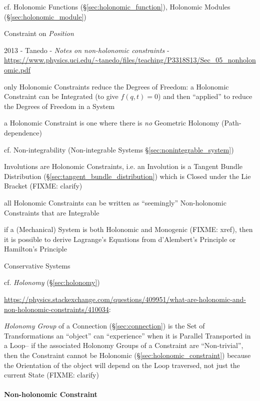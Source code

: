 \fist cf. Holonomic Functions (\S\ref{sec:holonomic_function}), Holonomic
Modules (\S\ref{sec:holonomic_module})

Constraint on \emph{Position}

\asterism

2013 - Tanedo - \emph{Notes on non-holonomic constraints} -
\url{https://www.physics.uci.edu/~tanedo/files/teaching/P3318S13/Sec_05_nonholonomic.pdf}

only Holonomic Constraints reduce the Degrees of Freedom: a Holonomic
Constraint can be Integrated (to give $f(q, t) = 0$) and then ``applied'' to
reduce the Degrees of Freedom in a System

a Holonomic Constraint is one where there is \emph{no} Geometric Holonomy
(Path-dependence)

cf. Non-integrability (Non-integrable Systems \S\ref{sec:nonintegrable_system})

Involutions are Holonomic Constraints, i.e. an Involution is a Tangent Bundle
Distribution (\S\ref{sec:tangent_bundle_distribution}) which is Closed under
the Lie Bracket (FIXME: clarify)

all Holonomic Constraints can be written as ``seemingly'' Non-holonomic
Constraints that are Integrable

\asterism

if a (Mechanical) System is both Holonomic and Monogenic (FIXME: xref), then it
is possible to derive Lagrange's Equations from d'Alembert's Principle or
Hamilton's Principle

Conservative Systems

cf. \emph{Holonomy} (\S\ref{sec:holonomy})

\url{https://physics.stackexchange.com/questions/409951/what-are-holonomic-and-non-holonomic-constraints/410034}:

\emph{Holonomy Group} of a Connection (\S\ref{sec:connection}) is the Set of
Transformations an ``object'' can ``experience'' when it is Parallel
Transported in a Loop-- if the associated Holonomy Groups of a Constraint are
``Non-trivial'', then the Constraint cannot be Holonomic
(\S\ref{sec:holonomic_constraint}) because the Orientation of the object will
depend on the Loop traversed, not just the current State (FIXME: clarify)



\paragraph{Non-holonomic Constraint}\label{sec:nonholonomic_constraint}\hfill


